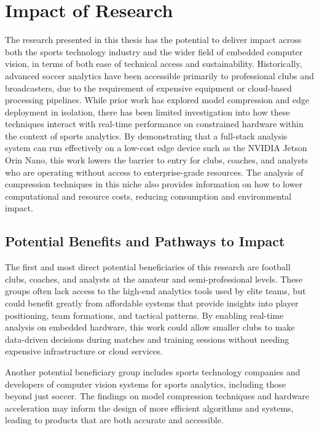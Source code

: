 \section{Impact of Research}

The research presented in this thesis has the potential to deliver impact across both the sports technology industry and the wider field of embedded computer vision, in terms of both ease of technical access
and sustainability. Historically, advanced soccer analytics have been accessible primarily to professional clubs and broadcasters, due to the requirement of expensive equipment or cloud-based processing pipelines. While prior work has explored model compression and edge deployment in isolation, there has been limited investigation into how these techniques interact with real-time performance on constrained hardware within the context of sports analytics. By demonstrating that a full-stack analysis system can run effectively on a low-cost edge device such as the NVIDIA Jetson Orin Nano, this work lowers the barrier to entry for clubs, coaches, and analysts who are operating without access to enterprise-grade resources. The analysis of compression techniques in this niche also provides information on how to lower computational and resource costs, reducing consumption and environmental impact. 

\subsection{Potential Benefits and Pathways to Impact}

The first and most direct potential beneficiaries of this research are football clubs, coaches, and analysts at the amateur and semi-professional levels. These groups often lack access to the high-end analytics tools used by elite teams, but could benefit greatly from affordable systems that provide insights into player positioning, team formations, and tactical patterns. By enabling real-time analysis on embedded hardware, this work could allow smaller clubs to make data-driven decisions during matches and training sessions without needing expensive infrastructure or cloud services. 

Another potential beneficiary group includes sports technology companies and developers of computer vision systems for sports analytics, including those beyond just soccer. The findings on model compression techniques and hardware acceleration may inform the design of more efficient algorithms and systems, leading to products that are both accurate and accessible.

